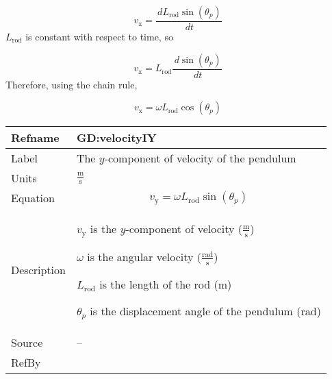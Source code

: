 \documentclass[12pt]{article}
\begin{document}
\begin{displaymath}
{v_{\text{x}}}=\frac{\,d{L_{\text{rod}}} \sin\left({θ_{p}}\right)}{\,dt}
\end{displaymath}
${L_{\text{rod}}}$ is constant with respect to time, so

\begin{displaymath}
{v_{\text{x}}}={L_{\text{rod}}} \frac{\,d\sin\left({θ_{p}}\right)}{\,dt}
\end{displaymath}
Therefore, using the chain rule,

\begin{displaymath}
{v_{\text{x}}}=ω {L_{\text{rod}}} \cos\left({θ_{p}}\right)
\end{displaymath}
\vspace{\baselineskip}
\noindent
\begin{minipage}{\textwidth}
\begin{tabular}{>{\raggedright}p{}>{\raggedright\arraybackslash}p{}}
\toprule \textbf{Refname} & \textbf{GD:velocityIY}
\label{GD:velocityIY}
\\ \midrule
Label & The $y$-component of velocity of the pendulum
        
\\ \midrule
Units & $\frac{\text{m}}{\text{s}}$
        
\\ \midrule
Equation & \begin{displaymath}
           {v_{\text{y}}}=ω {L_{\text{rod}}} \sin\left({θ_{p}}\right)
           \end{displaymath}
\\ \midrule
Description & \begin{symbDescription}
              \item{${v_{\text{y}}}$ is the $y$-component of velocity ($\frac{\text{m}}{\text{s}}$)}
              \item{$ω$ is the angular velocity ($\frac{\text{rad}}{\text{s}}$)}
              \item{${L_{\text{rod}}}$ is the length of the rod (${\text{m}}$)}
              \item{${θ_{p}}$ is the displacement angle of the pendulum (${\text{rad}}$)}
              \end{symbDescription}
\\ \midrule
Source & --
         
\\ \midrule
RefBy & 
\\ \bottomrule
\end{tabular}
\end{minipage}
\end{document}
